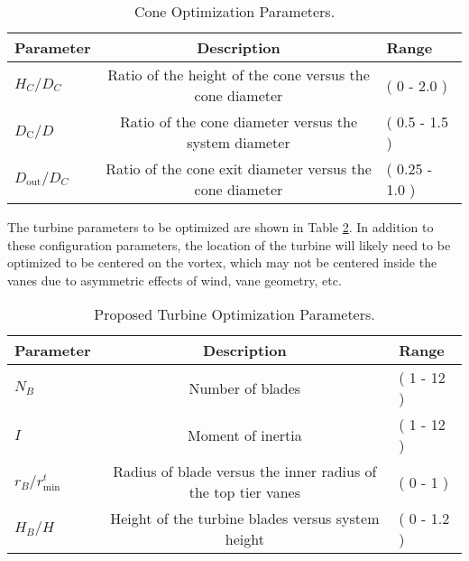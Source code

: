 %
%
\large
\begin{center}
\begin{table}[h]
 \centering
  \begin{tabular}{| l | c | l |}
    \hline
    Parameter & Description & Range \\
    \hline
    $H_C/D_C$ & Ratio of the height of the cone versus the cone diameter & ( 0 - 2.0 ) \\
    $D_{\text{C}}/D$ & Ratio of the cone diameter versus the system
       diameter & ( 0.5 - 1.5 ) \\
    $D_{\text{out}}/D_C$ & Ratio of the cone exit diameter versus the
       cone diameter & ( 0.25 - 1.0 ) \\ 
    \hline
  \end{tabular}
  \caption{Cone Optimization Parameters.}
  \label{tab:cone}
\end{table}
\end{center}
\normalsize

The turbine parameters to be optimized are shown in Table
\ref{tab:turbine}. In addition to these configuration parameters, the
location of the turbine will likely need to be optimized to be centered
on the vortex, which may not be centered inside the vanes due to
asymmetric effects of wind, vane geometry, etc. 

%
%
\large
\begin{center}
\begin{table}[h]
 \centering
  \begin{tabular}{| l | c | l |}
    \hline
    Parameter & Description & Range \\
    \hline
    $N_B$ & Number of blades & ( 1 - 12 ) \\
    $I$ & Moment of inertia & ( 1 - 12 ) \\
    $r_B/r_{\text{min}}^t$ & Radius of blade versus the inner radius of
       the top tier vanes & ( 0 - 1 ) \\
   $H_B/H$ & Height of the turbine blades versus system height & ( 0 - 1.2 ) \\
    \hline
  \end{tabular}
  \caption{Proposed Turbine Optimization Parameters.}
  \label{tab:turbine}
\end{table}
\end{center}
\normalsize

